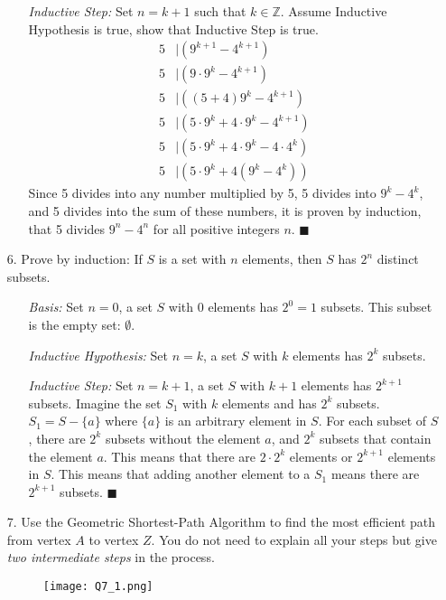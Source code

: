 \documentclass{article}
\begin{document}
\begin{itemize}
\begin{itemize}
        \item[]\emph{Inductive Step:} Set $n=k+1$ such that $k\in\mathbb{Z}$. Assume Inductive Hypothesis is true, show that Inductive Step is true.
        \begin{align}
            5&|\left( 9^{k+1}-4^{k+1}\right)\nonumber\\
            5&|\left(9\cdot9^k-4^{k+1}\right)\nonumber\\
            5&|\left((5+4)9^k-4^{k+1}\right)\nonumber\\
            5&|\left(5\cdot9^k+4\cdot9^k-4^{k+1}\right)\nonumber\\
            5&|\left(5\cdot9^k+4\cdot9^k-4\cdot4^k\right)\nonumber\\
            5&|\left(5\cdot9^k+4\left(9^k-4^k\right)\right)\nonumber
        \end{align}
        {\color{blue}Since 5 divides into any number multiplied by 5, 5 divides into $9^k-4^k$, and 5 divides into the sum of these numbers, it is proven by induction, that 5 divides $9^n-4^n$ for all positive integers $n$.} $\blacksquare$
    \end{itemize}
    
    \item[6.] Prove by induction: If $S$ is a set with $n$ elements, then $S$ has $2^n$ distinct subsets.
    \begin{itemize}
        \item[]\emph{Basis:} Set $n=0$, a set $S$ with $0$ elements has $2^0=1$ subsets.  This subset is the empty set: $\emptyset$.
        
        \item[]\emph{Inductive Hypothesis:} Set $n=k$, a set $S$ with $k$ elements has $2^k$ subsets.
        
        \item[]\emph{Inductive Step:} Set $n=k+1$, a set $S$ with $k+1$ elements has $2^{k+1}$ subsets.  Imagine the set $S_1$ with $k$ elements and has $2^k$ subsets.  $S_1=S-\{a\}$ where $\{a\}$ is an arbitrary element in $S$. For each subset of $S$, there are $2^k$ subsets without the element $a$, and $2^k$ subsets that contain the element $a$.  This means that there are $2\cdot2^k$ elements or $2^{k+1}$ elements in $S$. This means that adding another element to a $S_1$ means there are $2^{k+1}$ subsets. $\blacksquare$
    \end{itemize}
    
    \item[7.] Use the Geometric Shortest-Path Algorithm to find the most efficient path from vertex $A$ to vertex $Z$.  You do not need to explain all your steps but give \emph{two intermediate steps} in the process.
    \begin{figure}[h]
        \centering
        \texttt{[image: Q7\_1.png]}
    \end{figure}
    

\end{itemize}
\end{document}
